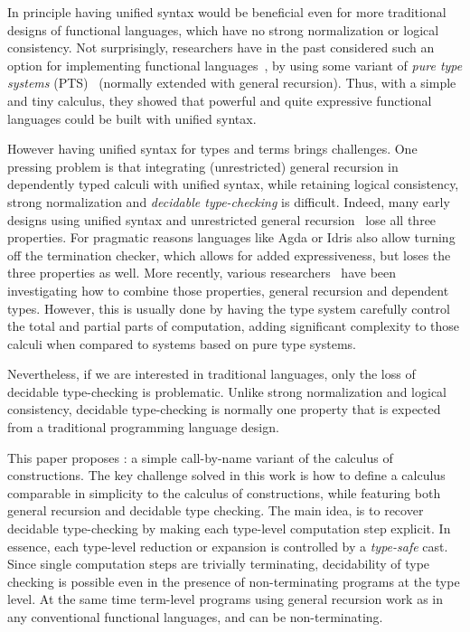 In principle having unified syntax would be beneficial even for more
traditional designs of functional languages, which have no strong
normalization or logical consistency. Not surprisingly, researchers
have in the past considered such an option for implementing functional
languages~\cite{cayenne, typeintype, pts:henk}, by using 
some variant of  \emph{pure type systems} (PTS)~\cite{handbook}
(normally extended with general recursion). Thus, with a simple and tiny 
calculus, they showed that powerful and quite expressive functional 
languages could be built with unified syntax.

However having unified syntax for types and terms brings
challenges. One pressing problem is that integrating (unrestricted)
general recursion in dependently typed calculi with unified syntax,
while retaining logical consistency, strong normalization and
\emph{decidable type-checking} is difficult. Indeed, many early
designs using unified syntax and unrestricted general
recursion~\cite{cayenne, typeintype} lose all three properties. 
For pragmatic reasons languages like Agda or Idris also allow 
turning off the termination checker, which allows for added 
expressiveness, but loses the three properties as well.
More recently, various
researchers~\cite{zombie:popl14,zombie:popl15,Swamy2011} have been
investigating how to combine those properties, general recursion and
dependent types. However, this is usually done by having the type
system carefully control the total and partial parts of computation,
adding significant complexity to those calculi when compared to
systems based on pure type systems.

\begin{comment}
 In
particular, dependently typed calculi typically support type-level
computation, but if general recursion is allowed during such
computation non-terminating programs will make the type-checking
procedure non-terminating as well. 
\end{comment}

Nevertheless, if we are interested in traditional languages, only the
loss of decidable type-checking is problematic. Unlike strong
normalization and logical consistency, decidable type-checking is
normally one property that is expected from a traditional programming
language design.  

This paper proposes \name: a simple call-by-name
variant of the calculus of constructions. The key challenge solved in
this work is how to define a calculus comparable in simplicity to the
calculus of constructions, while featuring both general recursion and
decidable type checking. The main idea, is to recover
decidable type-checking by making each type-level computation step
explicit. In essence, each type-level reduction or expansion is
controlled by a \emph{type-safe} cast. Since single computation steps
are trivially terminating, decidability of type checking is possible
even in the presence of non-terminating programs at the type level.
At the same time term-level programs using general recursion work as
in any conventional functional languages, and can be
non-terminating.

